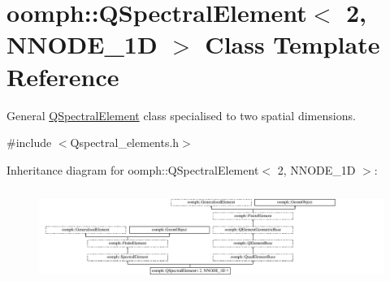 \hypertarget{classoomph_1_1QSpectralElement_3_012_00_01NNODE__1D_01_4}{}\section{oomph\+:\+:Q\+Spectral\+Element$<$ 2, N\+N\+O\+D\+E\+\_\+1D $>$ Class Template Reference}
\label{classoomph_1_1QSpectralElement_3_012_00_01NNODE__1D_01_4}


General \hyperlink{classoomph_1_1QSpectralElement}{Q\+Spectral\+Element} class specialised to two spatial dimensions.  




{\ttfamily \#include $<$Qspectral\+\_\+elements.\+h$>$}

Inheritance diagram for oomph\+:\+:Q\+Spectral\+Element$<$ 2, N\+N\+O\+D\+E\+\_\+1D $>$\+:\begin{figure}[H]
\begin{center}
\leavevmode
\includegraphics[height=3.088235cm]{classoomph_1_1QSpectralElement_3_012_00_01NNODE__1D_01_4}
\end{center}
\end{figure}
